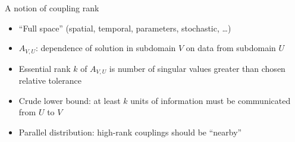 \documentclass{beamer}
\begin{document}
\begin{frame}{A notion of coupling rank}
  \begin{itemize}
  \item ``Full space'' (spatial, temporal, parameters, stochastic, \ldots)
  \end{itemize}
  \begin{figure}
    \centering
  \end{figure}
  \begin{itemize}
  \item $A_{V,U}$: dependence of solution in subdomain $V$ on data from subdomain $U$
  \item Essential rank $k$ of $A_{V,U}$ is number of singular values greater than chosen relative tolerance
  \item Crude lower bound: at least $k$ units of information must be communicated from $U$ to $V$
  \item Parallel distribution: high-rank couplings should be ``nearby''
  \end{itemize}
\end{frame}
\end{document}

